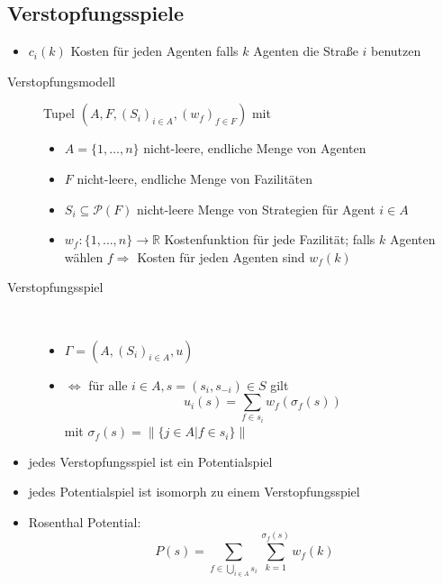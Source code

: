 \subsection{Verstopfungsspiele}
	\begin{itemize}
		\item $c_i(k)$ Kosten für jeden Agenten falls $k$ Agenten die Straße $i$ benutzen
	\end{itemize}
	\begin{description}
		\item[Verstopfungsmodell] Tupel $(A,F,(S_i)_{i\in A},(w_f)_{f\in F})$ mit
			\begin{itemize}
				\item $A=\{1,\dots, n\}$ nicht-leere, endliche Menge von Agenten
				\item $F$ nicht-leere, endliche Menge von Fazilitäten
				\item $S_i\subseteq\mathcal{P}(F)$ nicht-leere Menge von Strategien für Agent $i\in A$
				\item $w_f : \{1,\dots,n\}\rightarrow\mathbb{R}$ Kostenfunktion für jede Fazilität; falls $k$ Agenten wählen $f\Rightarrow$ Kosten für jeden Agenten sind $w_f(k)$
			\end{itemize}
		\item[Verstopfungsspiel] \ \\\vspace*{-\baselineskip}
			\begin{itemize}
				\item $\Gamma=(A,(S_i)_{i\in A},u)$
				\item $\Leftrightarrow$ für alle $i\in A, s=(s_i,s_{-i})\in S$ gilt
					\[u_i(s)=\sum\limits_{f\in s_i}w_f(\sigma_f(s))\]
					mit $\sigma_f(s)=\|\{j\in A|f\in s_i\}\|$
			\end{itemize}
	\end{description}
	\begin{itemize}
		\item jedes Verstopfungsspiel ist ein Potentialspiel
		\item jedes Potentialspiel ist isomorph zu einem Verstopfungsspiel
		\item Rosenthal Potential:
			\[P(s)=\sum\limits_{f\in\bigcup\limits_{i\in A}s_i}\sum\limits_{k=1}^{\sigma_f(s)}w_f(k)\]
	\end{itemize}